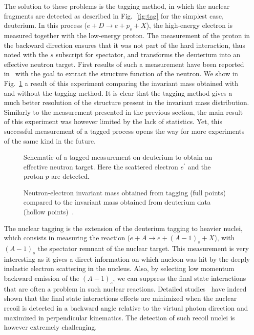 The solution to these problems is the tagging method, in which the nuclear fragments
are detected as described in Fig.~\ref{fig:tag} for the simplest case, deuterium.
In this process ($e+D \rightarrow e+p_s+X$), the high-energy electron is measured
together with the low-energy proton. The measurement of the proton in the backward 
direction ensures that it was not part of the hard interaction, thus noted with 
the $s$ subscript for spectator, and transforms the deuterium into 
an effective neutron target. First results of such a measurement
have been reported in~\cite{Baillie:2011za} with the goal to extract the structure
function of the neutron. We show in Fig.~\ref{fig:wstar} a result of this experiment
comparing the invariant mass obtained with and without the tagging method. It is 
clear that the tagging method gives a much better resolution of the structure 
present in the invariant mass distribution. Similarly to the measurement presented in 
the previous section, the main result of this experiment was however limited by the lack
of statistics. Yet, this successful measurement of a tagged process opens the way for more
experiments of the same kind in the future. 

\begin{figure}[htbp!]
\centering
\begin{minipage}{.48\textwidth}
  \centering
\caption{Schematic of a tagged measurement on deuterium to obtain an effective
neutron target. Here the scattered electron $e^\prime$ and the proton $p$ are detected.}
\label{fig:tag}
\end{minipage}%
\hfill
\begin{minipage}{.48\textwidth}
  \centering
\caption{Neutron-electron invariant mass obtained from tagging (full points) compared 
to the invariant mass obtained
from deuterium data (hollow points)~\cite{Baillie:2011za}.}
\label{fig:wstar}
\end{minipage}
\end{figure}

The nuclear tagging is the extension of the deuterium tagging to heavier nuclei, which
consists in measuring the reaction ($e+A \rightarrow e+(A-1)_s+X$), with
$(A-1)_s$ the spectator remnant of the nuclear target. This measurement is very 
interesting as it gives a direct information on which nucleon was hit by the 
deeply inelastic electron scattering in the nucleus. Also, by selecting 
low momentum backward emission of the $(A-1)_s$, we can suppress the 
final state interactions that are often a problem in such nuclear reactions. 
Detailed studies~\cite{CiofidegliAtti:2003pb,Alvioli:2006jd} have indeed shown 
that the final state interactions effects are minimized when the nuclear recoil
is detected in a backward angle relative to 
the virtual photon direction and maximized in perpendicular kinematics.
The detection of such recoil nuclei is however extremely challenging.

